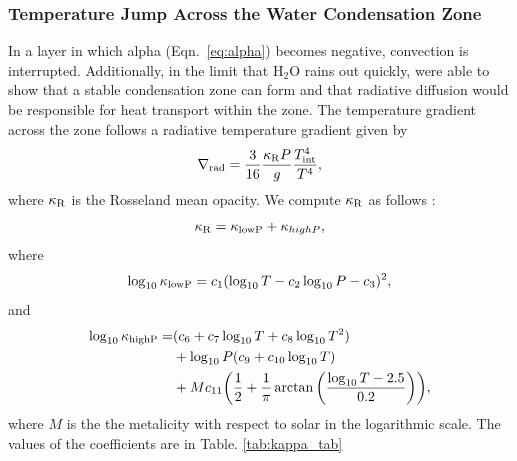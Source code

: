 \documentclass[11pt]{ucscthesisbs}
\begin{document}
\subsubsection{Temperature Jump Across the Water Condensation Zone}
In a layer in which alpha (Eqn.~\ref{eq:alpha}) becomes negative, convection is interrupted. Additionally, in the limit that H$_{2}$O rains out quickly, \citep{friedson_2017,leconte_2017} were able to show that a stable condensation zone can form and that radiative diffusion would be responsible for heat transport within the zone. The temperature gradient across the zone follows a radiative temperature gradient \citep{kippenhahn_2012} given by
\begin{align}
 \nabla_{\rm rad}= \frac{3}{16}\frac{\kappa_{\rm R} P}{g}\frac{T_{\rm int}^4}{T^4} ,
  \label{eq:radiative_gradient}
\end{align}
where $\kappa_{\rm R}$ is the Rosseland mean opacity. We compute $\kappa_{\rm R}$ as follows \citep{2013ApJ...775...10V}:
\begin{equation}
  \kappa_{\rm R} = \kappa_{\rm lowP} + \kappa_{highP},
  \label{eq:kappa1}
\end{equation}
where
\begin{equation}
  \log_{10}\kappa_{\rm lowP} = c_{1}(\log_{10}T - c_{2}\log_{10}P - c_{3})^{2},
  \label{eq:kappalow}
\end{equation}
and 
\begin{equation}
\begin{aligned}
  \log_{10}\kappa_{\rm highP} = & (c_{6} + c_{7}\log_{10}T + c_{8}\log_{10}T^2)  \\ 
                                & + \log_{10}P(c_{9} + c_{10}\log_{10}T) \\ 
                                & + Mc_{11}\bigg(\frac{1}{2} + \frac{1}{\pi}\arctan\bigg({\frac{\log_{10}T - 2.5}{0.2}}\bigg)\bigg),
  \label{eq:kappahigh}
\end{aligned}
\end{equation}
where $M$ is the the metalicity with respect to solar in the logarithmic scale. The values of the coefficients are in Table. \ref{tab:kappa_tab}
\end{document}
